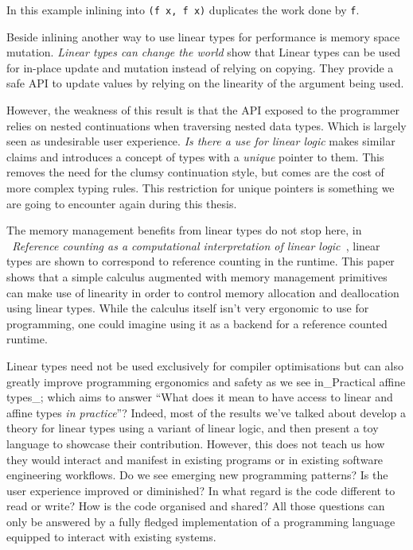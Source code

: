 \documentclass[
]{article}
\begin{document}
In this example inlining into \texttt{(f\ x,\ f\ x)} duplicates the work
done by \texttt{f}.

Beside inlining another way to use linear types for performance is
memory space mutation. \emph{Linear types can change the
world}\cite{linear_types_update} show that Linear types can be used for
in-place update and mutation instead of relying on copying. They provide
a safe API to update values by relying on the linearity of the argument
being used.

However, the weakness of this result is that the API exposed to the
programmer relies on nested continuations when traversing nested data
types. Which is largely seen as undesirable user experience. \emph{Is
there a use for linear logic}\cite{linear_use} makes similar claims and
introduces a concept of types with a \emph{unique} pointer to them. This
removes the need for the clumsy continuation style, but comes are the
cost of more complex typing rules. This restriction for unique pointers
is something we are going to encounter again during this thesis.

The memory management benefits from linear types do not stop here, in
\emph{~Reference counting as a computational interpretation of linear
logic~}\cite{linear_ref_count}, linear types are shown to correspond to
reference counting in the runtime. This paper shows that a simple
calculus augmented with memory management primitives can make use of
linearity in order to control memory allocation and deallocation using
linear types. While the calculus itself isn't very ergonomic to use for
programming, one could imagine using it as a backend for a reference
counted runtime.

Linear types need not be used exclusively for compiler optimisations but
can also greatly improve programming ergonomics and safety as we see
in\_Practical affine types\_\cite{affine_types}; which aims to answer
``What does it mean to have access to linear and affine types \emph{in
practice}''? Indeed, most of the results we've talked about develop a
theory for linear types using a variant of linear logic, and then
present a toy language to showcase their contribution. However, this
does not teach us how they would interact and manifest in existing
programs or in existing software engineering workflows. Do we see
emerging new programming patterns? Is the user experience improved or
diminished? In what regard is the code different to read or write? How
is the code organised and shared? All those questions can only be
answered by a fully fledged implementation of a programming language
equipped to interact with existing systems.
\end{document}
